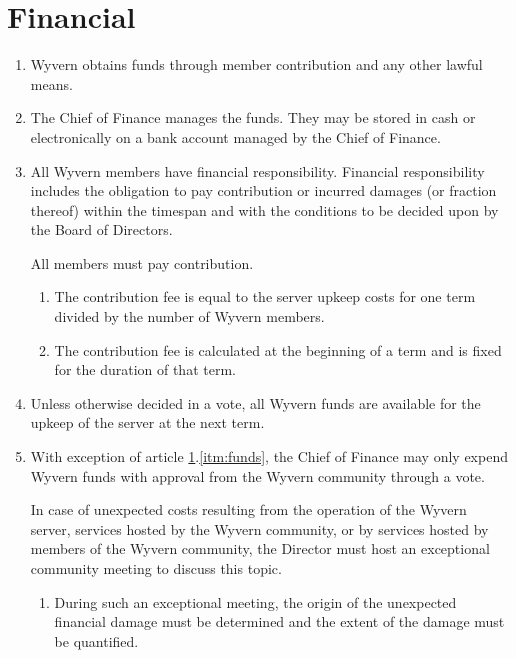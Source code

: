 \section{Financial}
\label{sec:financial}

\begin{enumerate}
    \item Wyvern obtains funds through member contribution and any other lawful means.

    \item The Chief of Finance manages the funds. They may be stored in cash or electronically on a bank account managed by the Chief of Finance.

    \item All Wyvern members have financial responsibility. Financial responsibility includes the obligation to pay contribution or incurred damages (or fraction thereof) within the timespan and with the conditions to be decided upon by the Board of Directors.

    \begin{item}
        All members must pay contribution.
        \begin{enumerate}
            \item The contribution fee is equal to the server upkeep costs for one term divided by the number of Wyvern members.
            \item The contribution fee is calculated at the beginning of a term and is fixed for the duration of that term.
        \end{enumerate}
    \end{item}

    \item \label{itm:funds} Unless otherwise decided in a vote, all Wyvern funds are available for the upkeep of the server at the next term.

    \item With exception of article \ref{sec:financial}.\ref{itm:funds}, the Chief of Finance may only expend Wyvern funds with approval from the Wyvern community through a vote.

    \begin{item}
         In case of unexpected costs resulting from the operation of the Wyvern server, services hosted by the Wyvern community, or by services hosted by members of the Wyvern community, the Director must host an exceptional community meeting to discuss this topic.
        
        \begin{enumerate}
            \item During such an exceptional meeting, the origin of the unexpected financial damage must be determined and the extent of the damage must be quantified.


\end{enumerate}
\end{item}
\end{enumerate}

